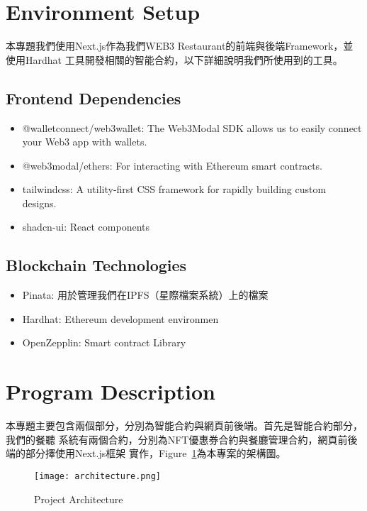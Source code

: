 \section{Environment Setup}

本專題我們使用Next.js作為我們WEB3 Restaurant的前端與後端Framework，並使用Hardhat
工具開發相關的智能合約，以下詳細說明我們所使用到的工具。

\subsection{Frontend Dependencies}

\begin{itemize}
  \item @walletconnect/web3wallet: The Web3Modal SDK allows us to easily
  connect your Web3 app with wallets.
  \item @web3modal/ethers: For interacting with Ethereum smart contracts.
  \item tailwindcss: A utility-first CSS framework for rapidly building custom
  designs.
  \item shadcn-ui: React components
\end{itemize}

\subsection{Blockchain Technologies}

\begin{itemize}
  \item Pinata: 用於管理我們在IPFS（星際檔案系統）上的檔案
  \item Hardhat: Ethereum development environmen
  \item OpenZepplin: Smart contract Library
\end{itemize}

\section{Program Description}

本專題主要包含兩個部分，分別為智能合約與網頁前後端。首先是智能合約部分，我們的餐聽
系統有兩個合約，分別為NFT優惠券合約與餐廳管理合約，網頁前後端的部分擇使用Next.js框架
實作，Figure~\ref{fig:architecture}為本專案的架構圖。

\begin{figure}
  \centering
  \texttt{[image: architecture.png]}
  \caption{Project Architecture}
  \label{fig:architecture}
\end{figure}

